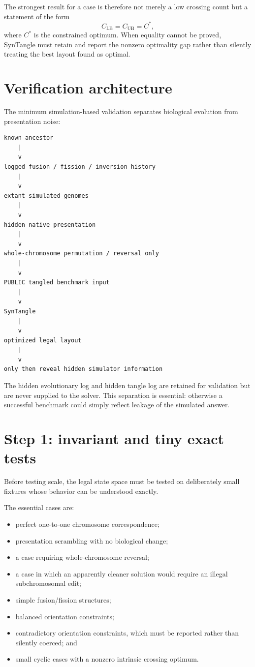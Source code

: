 \documentclass[11pt]{article}
\begin{document}
The strongest result for a case is therefore not merely a low crossing count
but a statement of the form
\[
  C_{\mathrm{LB}} = C_{\mathrm{UB}} = C^*,
\]
where \(C^*\) is the constrained optimum.  When equality cannot be proved,
SynTangle must retain and report the nonzero optimality gap rather than
silently treating the best layout found as optimal.

\section{Verification architecture}

The minimum simulation-based validation separates biological evolution from
presentation noise:

\begin{verbatim}
known ancestor
    |
    v
logged fusion / fission / inversion history
    |
    v
extant simulated genomes
    |
    v
hidden native presentation
    |
    v
whole-chromosome permutation / reversal only
    |
    v
PUBLIC tangled benchmark input
    |
    v
SynTangle
    |
    v
optimized legal layout
    |
    v
only then reveal hidden simulator information
\end{verbatim}

The hidden evolutionary log and hidden tangle log are retained for validation
but are never supplied to the solver.  This separation is essential: otherwise
a successful benchmark could simply reflect leakage of the simulated answer.

\section{Step 1: invariant and tiny exact tests}

Before testing scale, the legal state space must be tested on deliberately
small fixtures whose behavior can be understood exactly.

The essential cases are:

\begin{itemize}
  \item perfect one-to-one chromosome correspondence;
  \item presentation scrambling with no biological change;
  \item a case requiring whole-chromosome reversal;
  \item a case in which an apparently cleaner solution would require an
        illegal subchromosomal edit;
  \item simple fusion/fission structures;
  \item balanced orientation constraints;
  \item contradictory orientation constraints, which must be reported rather
        than silently coerced; and
  \item small cyclic cases with a nonzero intrinsic crossing optimum.
\end{itemize}
\end{document}
